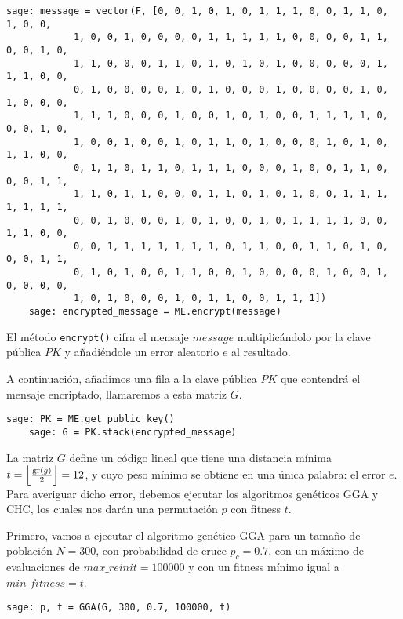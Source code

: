 \begin{exampleth}
    \begin{lstlisting}[gobble=4]
    sage: message = vector(F, [0, 0, 1, 0, 1, 0, 1, 1, 1, 0, 0, 1, 1, 0, 1, 0, 0, 
            1, 0, 0, 1, 0, 0, 0, 0, 1, 1, 1, 1, 1, 0, 0, 0, 0, 1, 1, 0, 0, 1, 0, 
            1, 1, 0, 0, 0, 1, 1, 0, 1, 0, 1, 0, 1, 0, 0, 0, 0, 0, 1, 1, 1, 0, 0, 
            0, 1, 0, 0, 0, 0, 1, 0, 1, 0, 0, 0, 1, 0, 0, 0, 0, 1, 0, 1, 0, 0, 0, 
            1, 1, 1, 0, 0, 0, 1, 0, 0, 1, 0, 1, 0, 0, 1, 1, 1, 1, 0, 0, 0, 1, 0, 
            1, 0, 0, 1, 0, 0, 1, 0, 1, 1, 0, 1, 0, 0, 0, 1, 0, 1, 0, 1, 1, 0, 0, 
            0, 1, 1, 0, 1, 1, 0, 1, 1, 1, 0, 0, 0, 1, 0, 0, 1, 1, 0, 0, 0, 1, 1, 
            1, 1, 0, 1, 1, 0, 0, 0, 1, 1, 0, 1, 0, 1, 0, 0, 1, 1, 1, 1, 1, 1, 1, 
            0, 0, 1, 0, 0, 0, 1, 0, 1, 0, 0, 1, 0, 1, 1, 1, 1, 0, 0, 1, 1, 0, 0, 
            0, 0, 1, 1, 1, 1, 1, 1, 1, 0, 1, 1, 0, 0, 1, 1, 0, 1, 0, 0, 0, 1, 1, 
            0, 1, 0, 1, 0, 0, 1, 1, 0, 0, 1, 0, 0, 0, 0, 1, 0, 0, 1, 0, 0, 0, 0, 
            1, 0, 1, 0, 0, 0, 1, 0, 1, 1, 0, 0, 1, 1, 1])
    sage: encrypted_message = ME.encrypt(message)
    \end{lstlisting}

    El método \texttt{encrypt()} cifra el mensaje $message$ multiplicándolo por la clave pública $PK$ y añadiéndole un error aleatorio $e$ al resultado.

    A continuación, añadimos una fila a la clave pública $PK$ que contendrá el mensaje encriptado, llamaremos a esta matriz $G$.

    \begin{lstlisting}[gobble=4]
    sage: PK = ME.get_public_key()
    sage: G = PK.stack(encrypted_message)
    \end{lstlisting}

    La matriz $G$ define un código lineal que tiene una distancia mínima $t = \left\lfloor \frac{\operatorname{gr}(g)}{2} \right\rfloor = 12$, y cuyo peso mínimo se obtiene en una única palabra: el error $e$. Para averiguar dicho error, debemos ejecutar los algoritmos genéticos GGA y CHC, los cuales nos darán una permutación $p$ con fitness $t$.

    Primero, vamos a ejecutar el algoritmo genético GGA para un tamaño de población $N = 300$, con probabilidad de cruce $p_c = 0.7$, con un máximo de evaluaciones de $max\_reinit = 100000$ y con un fitness mínimo igual a $min\_fitness = t$. 
    
    \begin{lstlisting}[gobble=4]
    sage: p, f = GGA(G, 300, 0.7, 100000, t)
    \end{lstlisting}


\end{exampleth}
